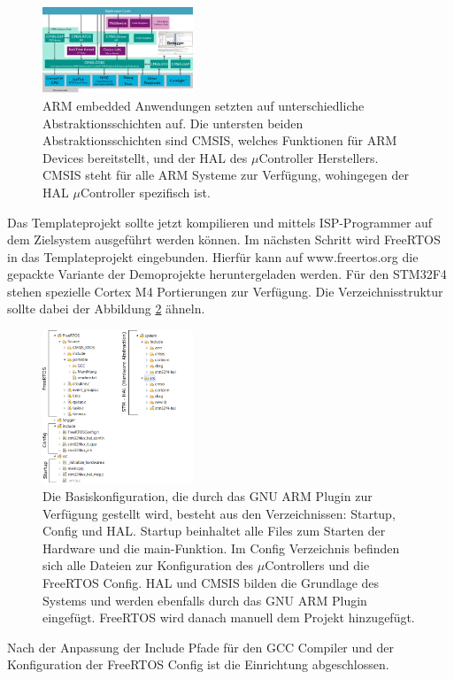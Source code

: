 \begin{figure}[htb]
	\centering
		\includegraphics[width=0.4\textwidth]{Pictures/Einrichtung/CMSISv4_small.jpg}
	\caption{ARM embedded Anwendungen setzten auf unterschiedliche Abstraktionsschichten auf. Die untersten beiden Abstraktionsschichten sind CMSIS, welches Funktionen für ARM Devices bereitstellt, und der HAL des $\mu$Controller Herstellers. CMSIS steht für alle ARM Systeme zur Verfügung, wohingegen der HAL $\mu$Controller spezifisch ist. }
	\label{fig:CMSIS}
\end{figure}
Das Templateprojekt sollte jetzt kompilieren und mittels ISP-Programmer auf dem Zielsystem ausgeführt werden können.
Im nächsten Schritt wird FreeRTOS in das Templateprojekt eingebunden. Hierfür kann auf www.freertos.org die gepackte Variante der Demoprojekte heruntergeladen werden. Für den STM32F4 stehen spezielle Cortex M4 Portierungen zur Verfügung. Die Verzeichnisstruktur sollte dabei der Abbildung \ref{fig:SourceTree} ähneln.
\begin{figure}[htb]
	\centering
		\includegraphics[width=0.4\textwidth]{Pictures/Einrichtung/sourceTree.png}
	\caption{Die Basiskonfiguration, die durch das GNU ARM Plugin zur Verfügung gestellt wird, besteht aus den Verzeichnissen: Startup, Config und HAL. Startup beinhaltet alle Files zum Starten der Hardware und die main-Funktion. Im Config Verzeichnis befinden sich alle Dateien zur Konfiguration des $\mu$Controllers und die FreeRTOS Config. HAL und CMSIS bilden die Grundlage des Systems und werden ebenfalls durch das GNU ARM Plugin eingefügt. FreeRTOS wird danach manuell dem Projekt hinzugefügt.}
	\label{fig:SourceTree}
\end{figure}
Nach der Anpassung der Include Pfade für den GCC Compiler und der Konfiguration der FreeRTOS Config ist die Einrichtung abgeschlossen.
